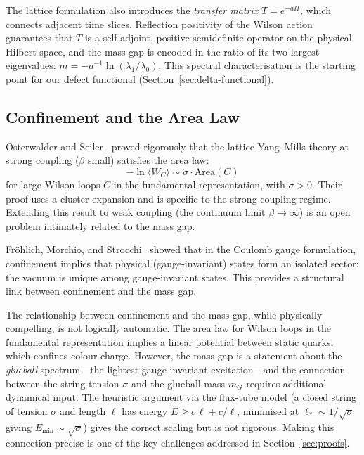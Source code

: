 \documentclass[11pt]{article}
\begin{document}
The lattice formulation also introduces the \emph{transfer matrix}
$T = e^{-aH}$, which connects adjacent time slices.  Reflection
positivity of the Wilson action~\cite{OstSchr} guarantees that $T$ is
a self-adjoint, positive-semidefinite operator on the physical Hilbert
space, and the mass gap is encoded in the ratio of its two largest
eigenvalues: $m = -a^{-1}\ln(\lambda_1/\lambda_0)$.  This spectral
characterisation is the starting point for our defect functional
(Section~\ref{sec:delta-functional}).

\subsection{Confinement and the Area Law}

Osterwalder and Seiler~\cite{OS} proved rigorously that the lattice
Yang--Mills theory at strong coupling ($\beta$ small) satisfies
the area law:
\begin{equation}\label{eq:area-law}
  -\ln \langle W_C \rangle \sim \sigma \cdot \mathrm{Area}(C)
\end{equation}
for large Wilson loops $C$ in the fundamental representation, with
$\sigma > 0$.  Their proof uses a cluster expansion and is specific
to the strong-coupling regime.  Extending this result to weak coupling
(the continuum limit $\beta \to \infty$) is an open problem intimately
related to the mass gap.

Fr\"ohlich, Morchio, and Strocchi~\cite{FMS} showed that in the
Coulomb gauge formulation, confinement implies that physical
(gauge-invariant) states form an isolated sector: the vacuum is
unique among gauge-invariant states.  This provides a structural link
between confinement and the mass gap.

The relationship between confinement and the mass gap, while physically
compelling, is not logically automatic.  The area law for Wilson loops
in the fundamental representation implies a linear potential between
static quarks, which confines colour charge.  However, the mass gap is
a statement about the \emph{glueball} spectrum---the lightest
gauge-invariant excitation---and the connection between the string
tension $\sigma$ and the glueball mass $m_G$ requires additional
dynamical input.  The heuristic argument via the flux-tube model (a
closed string of tension $\sigma$ and length $\ell$ has energy
$E \geq \sigma\ell + c/\ell$, minimised at $\ell_* \sim 1/\sqrt\sigma$
giving $E_{\min} \sim \sqrt\sigma$) gives the correct scaling but is not
rigorous.  Making this connection precise is one of the key challenges
addressed in Section~\ref{sec:proofs}.
\end{document}
